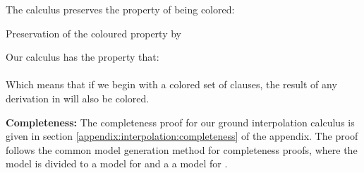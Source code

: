 \noindent
The calculus  preserves the property of being colored:
\begin{lemma}{Preservation of the coloured property by }

\noindent
Our calculus has the property that:\\
\\
Which means that if we begin with a colored set of clauses, the result of any derivation in  will also be colored.
\end{lemma}



\textbf{Completeness:}
The completeness proof for our ground interpolation calculus is given in section \ref{appendix:interpolation:completeness} of the appendix.
The proof follows the common model generation method for completeness proofs, where the model is divided to a model for  and a a model for .

